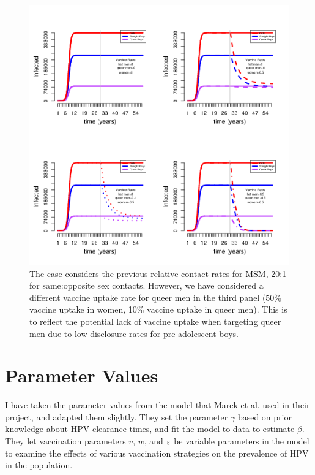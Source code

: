 \documentclass[12pt]{article}
\begin{document}
\begin{figure}[h!]
\includegraphics[width=\linewidth]{exampleFig/example3.png}
\caption{The case considers the previous relative contact rates for MSM, 20:1 for same:opposite sex contacts.  However, we have considered a different vaccine uptake rate for queer men in the third panel (50\% vaccine uptake in women, 10\% vaccine uptake in queer men).  This is to reflect the potential lack of vaccine uptake when targeting queer men due to low disclosure rates for pre-adolescent boys.}
\label{fig:example3}
\end{figure}


\section*{Parameter Values}

I have taken the parameter values from the model that Marek et al. used in their project, and adapted them slightly. They set the parameter $\gamma$ based on prior knowledge about HPV clearance times, and fit the model to data to estimate $\beta$. They let vaccination parameters $v$, $w$, and $\varepsilon$ be variable parameters in the model to examine the effects of various vaccination strategies on the prevalence of HPV in the population.
\end{document}
